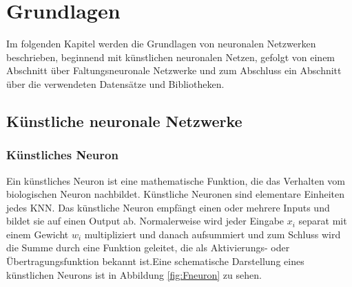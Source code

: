 \documentclass[12pt,a4paper]{scrartcl}
\numberwithin{equation}{section}
\begin{document}
 \newpage  %
 
\section{Grundlagen}\label{Grundlagen}
Im folgenden Kapitel werden die Grundlagen von neuronalen Netzwerken beschrieben, beginnend mit künstlichen neuronalen Netzen, gefolgt von einem Abschnitt über Faltungsneuronale Netzwerke und
zum Abschluss ein Abschnitt über die verwendeten Datensätze und Bibliotheken.
\subsection{Künstliche neuronale Netzwerke}
\subsubsection{Künstliches Neuron}
Ein künstliches Neuron\cite{kneuron} ist eine mathematische Funktion, die das Verhalten vom biologischen Neuron nachbildet. Künstliche Neuronen sind elementare Einheiten jedes \ac{KNN}. Das künstliche Neuron empfängt einen oder mehrere Inputs und bildet sie auf einen Output ab. Normalerweise wird jeder Eingabe $ x_i $ separat mit einem Gewicht $ w_i $ multipliziert und danach aufsummiert und zum Schluss wird die Summe durch eine Funktion geleitet, die als Aktivierungs- oder Übertragungsfunktion bekannt ist.Eine schematische Darstellung eines künstlichen Neurons ist in Abbildung \ref{fig:Fneuron}
zu sehen.
\end{document}
